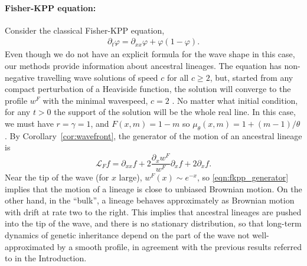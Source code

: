 \documentclass[EJP]{ejpecp} %
\newcommand{\Lgen}{\mathcal{L}}    %
\newcommand{\citep}[1]{\cite{#1}}
\begin{document}

\paragraph{Fisher-KPP equation:} 
Consider the classical Fisher-KPP equation,
\begin{align} \label{eqn:fkpp}
    \partial_t\varphi = \partial_{xx}\varphi + \varphi (1-\varphi) .
\end{align}
Even though we do not have an explicit formula for the wave shape in this case,
our methods provide information about ancestral lineages.
The equation has non-negative travelling wave solutions of 
speed $c$ for all $c \geq 2$, 
but, started from any compact perturbation of a Heaviside function, the 
solution will converge to the profile $w^F$ with the minimal wavespeed, $c=2$
\citep{kolmogorov/petrovsky/piscounov:1937,fife1977approach,bramson:1983}.
No matter what initial condition,
for any $t>0$ the support of the 
solution will be the whole real line. 
In this case, we must have $r = \gamma = 1$,
and $F(x, m) = 1 - m$ so $\mu_\theta(x, m) = 1 + (m-1)/\theta$.
By Corollary~\ref{cor:wavefront},
the generator of the motion of an ancestral lineage is
\begin{equation} \label{eqn:fkpp_generator}
    \Lgen_F  f
    =
    \partial_{xx}f + 2 \frac{\partial_xw^F}{w^F} \partial_x f + 2 \partial_xf .
\end{equation}
Near the tip of the wave (for $x$ large), $w^F(x) \sim e^{-x}$,
so \eqref{eqn:fkpp_generator} implies that
the motion of a lineage is close to unbiased Brownian motion.
On the other hand, in the ``bulk'', %
a lineage behaves approximately as
Brownian motion with drift at rate two to the right.
This implies that
ancestral lineages are pushed into the tip of the wave,
and there is no stationary distribution,
so that long-term dynamics of genetic inheritance
depend on the part of the wave not well-approximated by a smooth profile,
in agreement with the previous results referred to in the Introduction.


\end{document}
